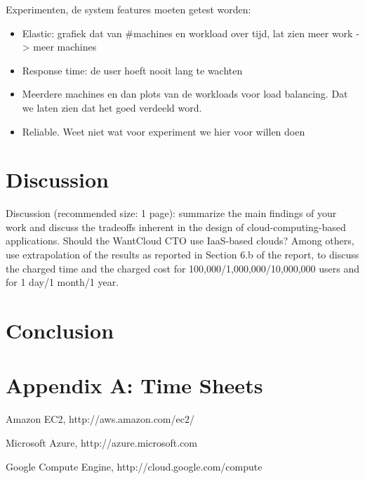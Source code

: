 \documentclass[twoside]{article}
\begin{document}
\begin{multicols}{2}
Experimenten, de system features moeten getest worden:
\begin{itemize}
\item Elastic: grafiek dat van \#machines en workload over tijd, lat zien meer work -> meer machines
\item Response time: de user hoeft nooit lang te wachten
\item Meerdere machines en dan plots van de workloads voor load balancing. Dat we laten zien dat het goed verdeeld word.
\item Reliable. Weet niet wat voor experiment we hier voor willen doen
\end{itemize}

\section{Discussion}
Discussion (recommended size: 1 page): summarize the main findings of your work and discuss the tradeoffs inherent in the design of cloud-computing-based applications. Should the WantCloud CTO use IaaS-based clouds? Among others, use extrapolation of the results as reported in Section 6.b of the report, to discuss the charged time and the charged cost for 100,000/1,000,000/10,000,000 users and for 1 day/1 month/1 year.


\section{Conclusion}


\section{Appendix A: Time Sheets}


\begin{thebibliography}{99} %

Amazon EC2, http://aws.amazon.com/ec2/

Microsoft Azure, http://azure.microsoft.com

Google Compute Engine, http://cloud.google.com/compute

\end{thebibliography}


\end{multicols}
\end{document}
